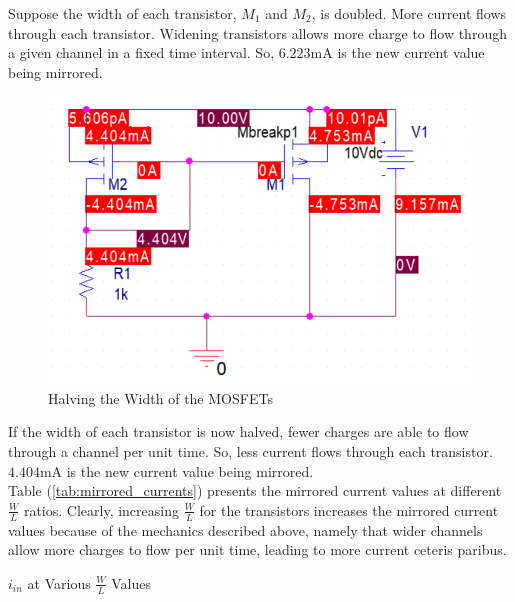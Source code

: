 \FloatBarrier

Suppose the width of each transistor, $M_1$ and $M_2$, is doubled.
More current flows through each transistor.
Widening transistors allows more charge to flow through a given channel in a fixed time interval. 
So, $6.223$\si{\milli\ampere} is the new current value being mirrored.

\FloatBarrier

\begin{figure}[h!]
	\centering
	\includegraphics[scale=0.75]{./images/half_width_means_half_current.PNG}
	\caption{Halving the Width of the MOSFETs}
	\label{fig:half_width_means_half_current}
\end{figure}

\FloatBarrier

If the width of each transistor is now halved, fewer charges are able to flow through a channel per unit time.
So, less current flows through each transistor.
$4.404$\si{\milli\ampere} is the new current value being mirrored. \\

Table (\ref{tab:mirrored_currents}) presents the mirrored current values at different $\frac{W}{L}$ ratios.
Clearly, increasing $\frac{W}{L}$ for the transistors increases the mirrored current values because of the mechanics described above, namely that wider channels allow more charges to flow per unit time, leading to more current ceteris paribus.

\FloatBarrier

\begin{table}[h!]
	\centering
	\caption{$i_{in}$ at Various $\frac{W}{L}$ Values}
	\label{tab:mirrored_currents}
\end{table}

\FloatBarrier
